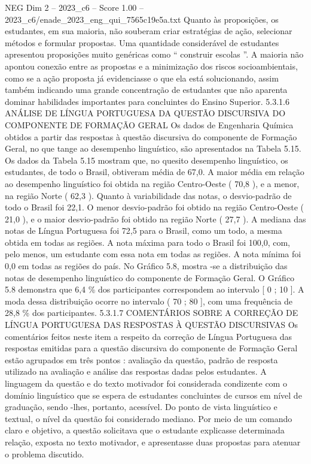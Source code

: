 \begin{textsample}{NEG Dim 2 – 2023\_c6 – Score 1.00 – 2023\_c6/enade\_2023\_eng\_qui\_7565c19e5a.txt}
Quanto às proposições, os estudantes, em sua maioria, não souberam criar estratégias de ação, selecionar métodos e formular propostas.
Uma quantidade considerável de estudantes apresentou proposições muito genéricas como “ construir escolas ”.
A maioria não apontou conexão entre as propostas e a minimização dos riscos socioambientais, como se a ação proposta já evidenciasse o que ela está solucionando, assim também indicando uma grande concentração de estudantes que não aparenta dominar habilidades importantes para concluintes do Ensino Superior. 5.3.1.6 ANÁLISE DE LÍNGUA PORTUGUESA DA QUESTÃO DISCURSIVA DO COMPONENTE DE FORMAÇÃO GERAL Os dados de Engenharia Química obtidos a partir das respostas à questão discursiva do componente de Formação Geral, no que tange ao desempenho linguístico, são apresentados na Tabela 5.15.
Os dados da Tabela 5.15 mostram que, no quesito desempenho linguístico, os estudantes, de todo o Brasil, obtiveram média de 67,0.
A maior média em relação ao desempenho linguístico foi obtida na região Centro-Oeste ( 70,8 ), e a menor, na região Norte ( 62,3 ).
Quanto à variabilidade das notas, o desvio-padrão de todo o Brasil foi 22,1.
O menor desvio-padrão foi obtido na região Centro-Oeste ( 21,0 ), e o maior desvio-padrão foi obtido na região Norte ( 27,7 ).
A mediana das notas de Língua Portuguesa foi 72,5 para o Brasil, como um todo, a mesma obtida em todas as regiões.
A nota máxima para todo o Brasil foi 100,0, com, pelo menos, um estudante com essa nota em todas as regiões.
A nota mínima foi 0,0 em todas as regiões do país.
No Gráfico 5.8, mostra -se a distribuição das notas de desempenho linguístico do componente de Formação Geral.
O Gráfico 5.8 demonstra que 6,4 \% dos participantes correspondem ao intervalo [ 0 ; 10 ].
A moda dessa distribuição ocorre no intervalo ( 70 ; 80 ], com uma frequência de 28,8 \% dos participantes. 5.3.1.7 COMENTÁRIOS SOBRE A CORREÇÃO DE LÍNGUA PORTUGUESA DAS RESPOSTAS À QUESTÃO DISCURSIVAS Os comentários feitos neste item a respeito da correção de Língua Portuguesa das respostas emitidas para a questão discursiva do componente de Formação Geral estão agrupados em três pontos : avaliação da questão, padrão de resposta utilizado na avaliação e análise das respostas dadas pelos estudantes.
A linguagem da questão e do texto motivador foi considerada condizente com o domínio linguístico que se espera de estudantes concluintes de cursos em nível de graduação, sendo -lhes, portanto, acessível.
Do ponto de vista linguístico e textual, o nível da questão foi considerado mediano.
Por meio de um comando claro e objetivo, a questão solicitava que o estudante explicasse determinada relação, exposta no texto motivador, e apresentasse duas propostas para atenuar o problema discutido.

\end{textsample}
